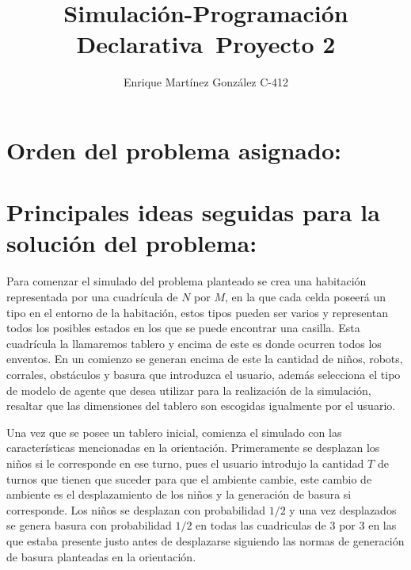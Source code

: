 \documentclass[titlepage,11pt]{scrartcl}
\title{	
    \normalfont\normalsize
	\vspace{25pt}
	{\huge Simulación-Programación Declarativa\ Proyecto 2}
	\vspace{12pt}
}
\author{\LARGE Enrique Martínez González C-412}
\date{}
\begin{document}
\maketitle

\section{Orden del problema asignado:}

\section{Principales ideas seguidas para la solución del problema:}
Para comenzar el simulado del problema planteado se crea una habitación representada por una cuadrícula de $N$ por $M$, en la que cada celda poseerá un tipo en el entorno de la habitación, estos tipos pueden ser varios y representan todos los posibles estados en los que se puede encontrar una casilla. Esta cuadrícula la llamaremos tablero y encima de este es donde ocurren todos los enventos. En un comienzo se generan encima de este la cantidad de niños, robots, corrales, obstáculos y basura que introduzca el usuario, además selecciona el tipo de modelo de agente que desea utilizar para la realización de la simulación, resaltar que las dimensiones del tablero son escogidas igualmente por el usuario.

Una vez que se posee un tablero inicial, comienza el simulado con las características mencionadas en la orientación. Primeramente se desplazan los niños si le corresponde en ese turno, pues el usuario introdujo la cantidad $T$ de turnos que tienen que suceder para que el ambiente cambie, este cambio de ambiente es el desplazamiento de los niños y la generación de basura si corresponde. Los niños se desplazan con probabilidad $1/2$ y una vez desplazados se genera basura con probabilidad $1/2$ en todas las cuadriculas de $3$ por $3$ en las que estaba presente justo antes de desplazarse siguiendo las normas de generación de basura planteadas en la orientación.
\end{document}
